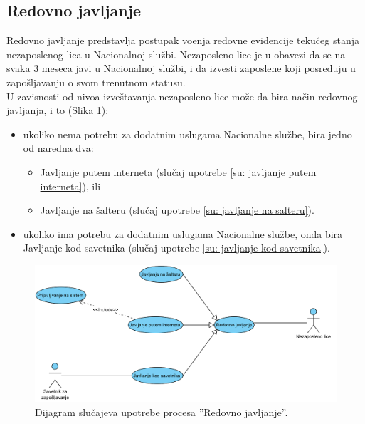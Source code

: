 \subsection{Redovno javljanje}

Redovno javljanje predstavlja postupak vo\dj enja redovne evidencije teku\' ceg stanja nezaposlenog lica u Nacionalnoj slu\v zbi. Nezaposleno lice je u obavezi da se na svaka 3 meseca javi u Nacionalnoj slu\v zbi, i da izvesti zaposlene koji posreduju u zapo\v sljavanju o svom trenutnom statusu.\\

U zavisnosti od nivoa izve\v stavanja nezaposleno lice mo\v ze da bira na\v cin redovnog javljanja, i to (Slika \ref{dsu: redovno javljanje}):
\begin{itemize}
	\item ukoliko nema potrebu za dodatnim uslugama Nacionalne slu\v zbe, bira jedno od naredna dva:
	\begin{itemize}
		\item Javljanje putem interneta (slu\v caj upotrebe \ref{su: javljanje putem interneta}), ili
		\item Javljanje na \v salteru (slu\v caj upotrebe \ref{su: javljanje na salteru}).
	\end{itemize}
	
	\item ukoliko ima potrebu za dodatnim uslugama Nacionalne slu\v zbe, onda bira Javljanje kod savetnika (slu\v caj upotrebe \ref{su: javljanje kod savetnika}).
\end{itemize}

\begin{figure}[H]
	\centering
	\includegraphics[width=\textwidth]{dijagrami/dijagrami-slucajeva-upotrebe/redovno-javljanje.png}
	\caption{Dijagram slu\v cajeva upotrebe procesa ''Redovno javljanje''.}
	\label{dsu: redovno javljanje}
\end{figure}

